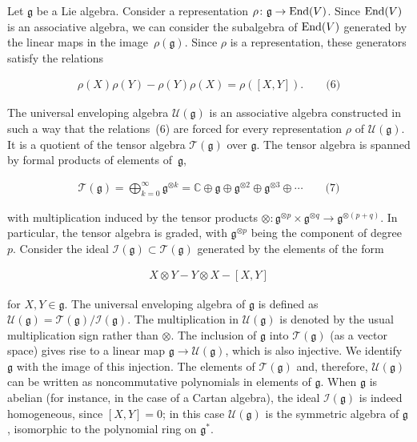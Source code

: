 \documentclass[10pt,a4paper]{article}
\begin{document}
Let $\mathfrak{g}$ be a Lie algebra. Consider a representation $\rho\colon\mathfrak{g}\to\textnormal{End}(V)$.
Since $\textnormal{End}(V)$ is an associative algebra, we can consider the subalgebra of $\textnormal{End}(V)$ generated by the linear maps in the image $\rho(\mathfrak{g})$.
Since $\rho$ is a representation, these generators satisfy the relations



\[\begin{aligned}
\rho(X)\rho(Y)-\rho(Y)\rho(X)=\rho([X,Y]).\qquad\text{(6)}
\end{aligned}\]




The universal enveloping algebra $\mathcal{U}(\mathfrak{g})$ is an associative algebra constructed in such a way that the relations (6) are forced for every representation $\rho$ of $\mathcal{U}(\mathfrak{g})$.
It is a quotient of the tensor algebra $\mathcal{T}(\mathfrak{g})$ over $\mathfrak{g}$. The tensor algebra is spanned by formal products of elements of $\mathfrak{g}$,



\[\begin{aligned}
\displaystyle\mathcal{T}(\mathfrak{g})=\bigoplus_{k=0}^{\infty}\mathfrak{g}^{\otimes k}=\mathbb{C}\oplus\mathfrak{g}\oplus\mathfrak{g}^{\otimes 2}\oplus\mathfrak{g}^{\otimes 3}\oplus\cdots\qquad\text{(7)}
\end{aligned}\]


with multiplication induced by the tensor products $\otimes\colon\mathfrak{g}^{\otimes p}\times\mathfrak{g}^{\otimes q}\to\mathfrak{g}^{\otimes(p+q)}$. In particular, the tensor algebra is graded, with $\mathfrak{g}^{\otimes p}$ being the component of degree $p$. Consider the ideal $\mathcal{I}(\mathfrak{g})\subset\mathcal{T}(\mathfrak{g})$ generated by the elements of the form



\[\begin{aligned}
X\otimes Y-Y\otimes X-[X,Y]
\end{aligned}\]


for $X,Y\in\mathfrak{g}$.
The universal enveloping algebra of $\mathfrak{g}$ is defined as $\mathcal{U}(\mathfrak{g})=\mathcal{T}(\mathfrak{g})/\mathcal{I}(\mathfrak{g})$.
The multiplication in $\mathcal{U}(\mathfrak{g})$ is denoted by the usual multiplication sign rather than $\otimes$.
The inclusion of $\mathfrak{g}$ into $\mathcal{T}(\mathfrak{g})$ (as a vector space) gives rise to a linear map $\mathfrak{g}\to\mathcal{U}(\mathfrak{g})$, which is also injective.
We identify $\mathfrak{g}$ with the image of this injection.
The elements of $\mathcal{T}(\mathfrak{g})$ and, therefore, $\mathcal{U}(\mathfrak{g})$ can be written as noncommutative polynomials in elements of $\mathfrak{g}$. When $\mathfrak{g}$ is abelian (for instance, in the case of a Cartan algebra), the ideal $\mathcal{I}(\mathfrak{g})$ is indeed homogeneous, since $[X,Y]=0$; in this case $\mathcal{U}(\mathfrak{g})$ is the symmetric algebra of $\mathfrak{g}$, isomorphic to the polynomial ring on $\mathfrak{g}^{*}$.
\end{document}
